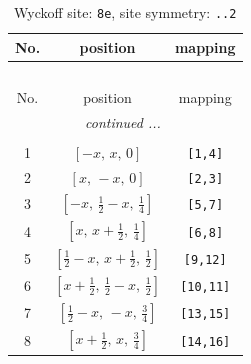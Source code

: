 \documentclass[fleqn,8pt]{jsarticle}
\begin{document}
\begin{longtable}{ccc}
\caption{Wyckoff site: {\tt 8e}, site symmetry: {\tt ..2}}
 \\
 \hline \hline
No. & position & mapping \\ \hline \endfirsthead

\multicolumn{2}{l}{\tablename\ \thetable{}} \\
 \hline \hline
No. & position & mapping \\ \hline \endhead

 \hline \hline
\multicolumn{2}{r}{\footnotesize\it continued ...} \\ \endfoot

 \hline \hline
\multicolumn{2}{r}{} \\ \endlastfoot

1 & $\left[ - x,\, x,\, 0 \right]$ & {\tt [1,4]} \\ \hline
2 & $\left[ x,\, - x,\, 0 \right]$ & {\tt [2,3]} \\ \hline
3 & $\left[ - x,\, \frac{1}{2} - x,\, \frac{1}{4} \right]$ & {\tt [5,7]} \\ \hline
4 & $\left[ x,\, x + \frac{1}{2},\, \frac{1}{4} \right]$ & {\tt [6,8]} \\ \hline
5 & $\left[ \frac{1}{2} - x,\, x + \frac{1}{2},\, \frac{1}{2} \right]$ & {\tt [9,12]} \\ \hline
6 & $\left[ x + \frac{1}{2},\, \frac{1}{2} - x,\, \frac{1}{2} \right]$ & {\tt [10,11]} \\ \hline
7 & $\left[ \frac{1}{2} - x,\, - x,\, \frac{3}{4} \right]$ & {\tt [13,15]} \\ \hline
8 & $\left[ x + \frac{1}{2},\, x,\, \frac{3}{4} \right]$ & {\tt [14,16]} \\
\end{longtable}
\renewcommand{\arraystretch}{1.2}
\end{document}
